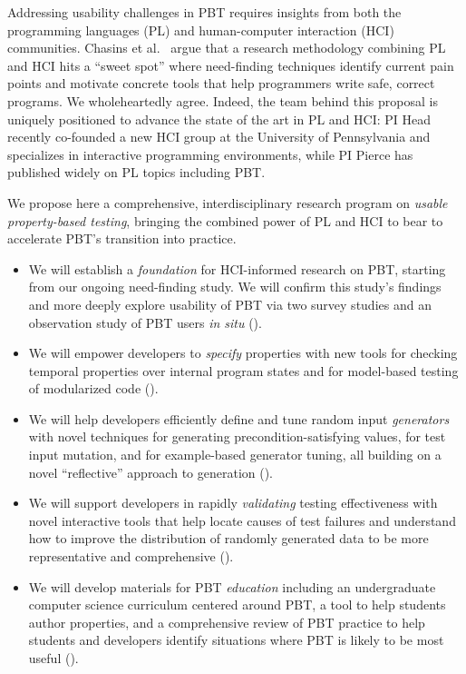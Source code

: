 Addressing usability challenges in PBT requires insights from both the
programming languages (PL) and
human-computer interaction (HCI) communities.  Chasins et
al.~\cite{chasins_pl_2021} argue that a research methodology
combining PL and HCI hits a ``sweet spot'' where need-finding techniques identify
current pain points and motivate concrete tools that help programmers write
safe, correct programs. We wholeheartedly agree.
Indeed, the team behind this proposal is uniquely positioned to advance the
state of the art in PL and HCI: PI Head recently co-founded
a new HCI group at the University of Pennsylvania and specializes in interactive
programming environments, while PI Pierce has
published widely on PL topics including PBT.

We propose here a comprehensive, interdisciplinary research program on
\emph{usable
property-based testing}, bringing the combined power of PL and HCI to bear to
accelerate PBT's transition into practice.
\begin{itemize}[noitemsep]
\item We will establish a \emph{foundation} for HCI-informed research on PBT,
starting from our ongoing need-finding study. We will confirm
this study's findings and more deeply explore usability of PBT via
two survey studies and an observation study
of PBT users {\em in situ} ().
  \item We will empower developers to \emph{specify} properties with
  new tools for checking temporal properties over internal program states and
for model-based testing of modularized code ().
  \item We will help developers efficiently define and tune random input
\emph{generators} with novel techniques for generating precondition-satisfying
values, for test input mutation, and for example-based generator
tuning, all building
  on a novel ``reflective'' approach to generation ().
  \item We will support developers in rapidly \emph{validating} testing
  effectiveness with novel interactive tools that help
locate causes of test failures and understand how to improve the
distribution of randomly generated
data to be more representative and comprehensive
().
  \item We will develop materials for PBT \emph{education}
  including an undergraduate computer science curriculum centered around PBT, a
  tool to help students author properties, and a comprehensive review of PBT
  practice to help students and developers identify situations where
  PBT is likely to be most useful ().
\end{itemize}
